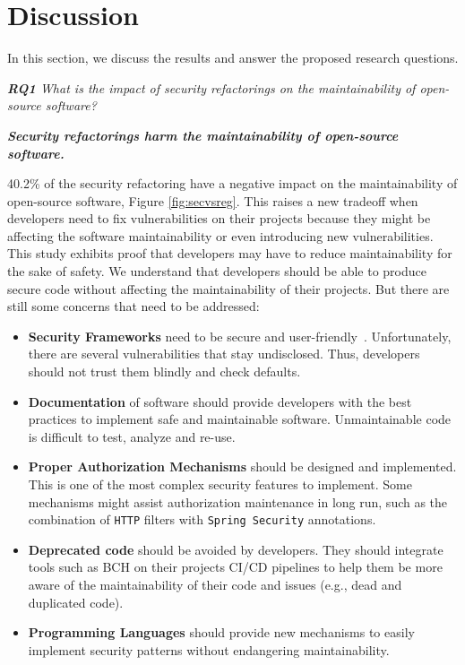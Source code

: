 \documentclass[10pt,conference]{IEEEtran}
\begin{document}
{\section{Discussion}\label{sec:discussion}

In this section, we discuss the results and answer the proposed research questions.

\begin{framed}
\textit{\textbf{RQ1} What is the impact of security refactorings on the maintainability
of open-source software?}
\end{framed}

\textbf{\textit{Security refactorings harm the maintainability of open-source software.}}

40.2\% of the security refactoring have a negative impact on the maintainability
of open-source software, Figure \ref{fig:secvsreg}. This raises a new tradeoff when
developers need to fix vulnerabilities on their projects because they might be affecting
the software maintainability or even introducing new vulnerabilities. This study exhibits
proof that developers may have to reduce maintainability for the sake of safety. We understand
that developers should be able to produce secure code without affecting the maintainability of
their projects. But there are still some concerns that need to be addressed:
\begin{itemize}
	\item \textbf{Security Frameworks} need to be secure and user-friendly~\cite{5287006, 7676144}. Unfortunately, 
	there are several vulnerabilities that stay undisclosed. Thus, developers should not 
	trust them blindly and check defaults.
	\item \textbf{Documentation} of software should provide developers with the best practices to implement safe and maintainable software. Unmaintainable code is difficult to test, analyze and re-use.
	\item \textbf{Proper Authorization Mechanisms} should be designed and implemented. This is
	one of the most complex security features to implement. Some mechanisms might assist authorization maintenance in long run, such as the combination of \texttt{HTTP} filters with \texttt{Spring Security} annotations.
	\item \textbf{Deprecated code} should be avoided by developers. They should integrate tools such as BCH on their projects CI/CD pipelines to help them be more aware of the maintainability of their code and issues (e.g., dead and duplicated code).
	\item\textbf{Programming Languages} should provide new mechanisms to easily implement security patterns without endangering maintainability.


\end{itemize}}
\end{document}
